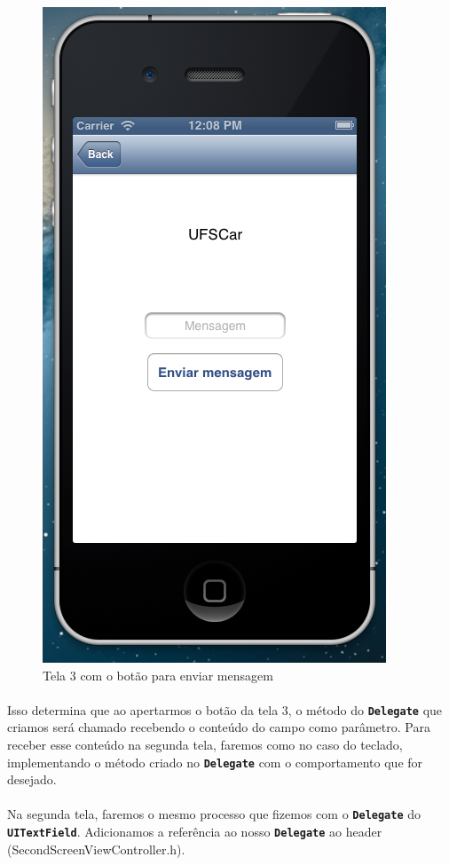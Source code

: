 \documentclass[a4paper,12pt,brazil,doubleside]{book}
\begin{document}
\begin{singlespace}
\begin{figure}[H]
  \centering
  \includegraphics[totalheight=0.6\textheight]{figuras/3/simulador3_tela3.png}
  \caption{Tela 3 com o botão para enviar mensagem}
  \label{fig:a}
\end{figure}

\paragraph{}Isso determina que ao apertarmos o botão da tela 3, o método do \texttt{\textbf{Delegate}} que criamos será chamado recebendo o conteúdo do campo como parâmetro. Para receber esse conteúdo na segunda tela, faremos como no caso do teclado, implementando o método criado no \texttt{\textbf{Delegate}} com o comportamento que for desejado.
\paragraph{}Na segunda tela, faremos o mesmo processo que fizemos com o \texttt{\textbf{Delegate}} do \texttt{\textbf{UITextField}}. Adicionamos a referência ao nosso \texttt{\textbf{Delegate}} ao header (SecondScreenViewController.h).\\


\end{singlespace}
\end{document}
